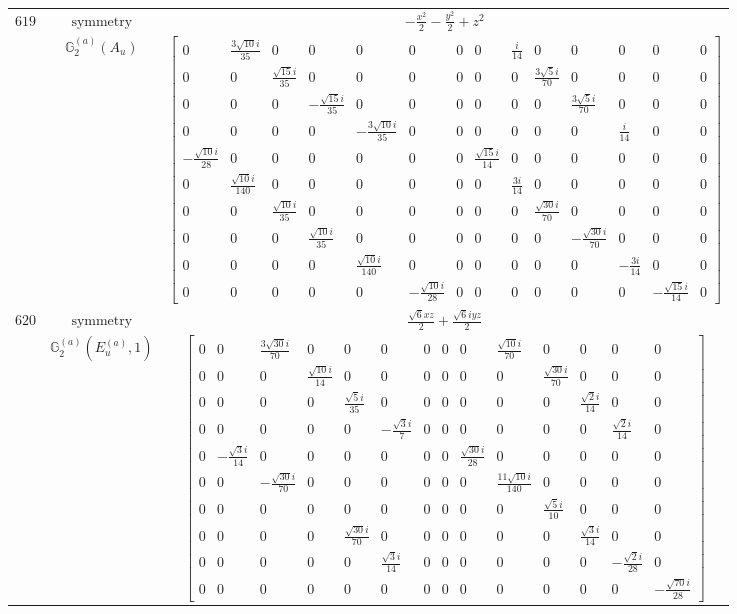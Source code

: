 \documentclass[fleqn,8pt,landscape]{jsarticle}
\begin{document}
\begin{longtable}{ccc}
$ 619 $ & $ \text{symmetry} $ & $ - \frac{x^{2}}{2} - \frac{y^{2}}{2} + z^{2} $ \\
$  $ & $ \mathbb{G}_{2}^{(a)}(A_{u}) $ & $ \begin{bmatrix} 0 & \frac{3 \sqrt{10} i}{35} & 0 & 0 & 0 & 0 & 0 & 0 & \frac{i}{14} & 0 & 0 & 0 & 0 & 0 \\ 0 & 0 & \frac{\sqrt{15} i}{35} & 0 & 0 & 0 & 0 & 0 & 0 & \frac{3 \sqrt{5} i}{70} & 0 & 0 & 0 & 0 \\ 0 & 0 & 0 & - \frac{\sqrt{15} i}{35} & 0 & 0 & 0 & 0 & 0 & 0 & \frac{3 \sqrt{5} i}{70} & 0 & 0 & 0 \\ 0 & 0 & 0 & 0 & - \frac{3 \sqrt{10} i}{35} & 0 & 0 & 0 & 0 & 0 & 0 & \frac{i}{14} & 0 & 0 \\ - \frac{\sqrt{10} i}{28} & 0 & 0 & 0 & 0 & 0 & 0 & \frac{\sqrt{15} i}{14} & 0 & 0 & 0 & 0 & 0 & 0 \\ 0 & \frac{\sqrt{10} i}{140} & 0 & 0 & 0 & 0 & 0 & 0 & \frac{3 i}{14} & 0 & 0 & 0 & 0 & 0 \\ 0 & 0 & \frac{\sqrt{10} i}{35} & 0 & 0 & 0 & 0 & 0 & 0 & \frac{\sqrt{30} i}{70} & 0 & 0 & 0 & 0 \\ 0 & 0 & 0 & \frac{\sqrt{10} i}{35} & 0 & 0 & 0 & 0 & 0 & 0 & - \frac{\sqrt{30} i}{70} & 0 & 0 & 0 \\ 0 & 0 & 0 & 0 & \frac{\sqrt{10} i}{140} & 0 & 0 & 0 & 0 & 0 & 0 & - \frac{3 i}{14} & 0 & 0 \\ 0 & 0 & 0 & 0 & 0 & - \frac{\sqrt{10} i}{28} & 0 & 0 & 0 & 0 & 0 & 0 & - \frac{\sqrt{15} i}{14} & 0 \end{bmatrix} $ \\ \hline
$ 620 $ & $ \text{symmetry} $ & $ \frac{\sqrt{6} x z}{2} + \frac{\sqrt{6} i y z}{2} $ \\
$  $ & $ \mathbb{G}_{2}^{(a)}(E_{u}^{(a)},1) $ & $ \begin{bmatrix} 0 & 0 & \frac{3 \sqrt{30} i}{70} & 0 & 0 & 0 & 0 & 0 & 0 & \frac{\sqrt{10} i}{70} & 0 & 0 & 0 & 0 \\ 0 & 0 & 0 & \frac{\sqrt{10} i}{14} & 0 & 0 & 0 & 0 & 0 & 0 & \frac{\sqrt{30} i}{70} & 0 & 0 & 0 \\ 0 & 0 & 0 & 0 & \frac{\sqrt{5} i}{35} & 0 & 0 & 0 & 0 & 0 & 0 & \frac{\sqrt{2} i}{14} & 0 & 0 \\ 0 & 0 & 0 & 0 & 0 & - \frac{\sqrt{3} i}{7} & 0 & 0 & 0 & 0 & 0 & 0 & \frac{\sqrt{2} i}{14} & 0 \\ 0 & - \frac{\sqrt{3} i}{14} & 0 & 0 & 0 & 0 & 0 & 0 & \frac{\sqrt{30} i}{28} & 0 & 0 & 0 & 0 & 0 \\ 0 & 0 & - \frac{\sqrt{30} i}{70} & 0 & 0 & 0 & 0 & 0 & 0 & \frac{11 \sqrt{10} i}{140} & 0 & 0 & 0 & 0 \\ 0 & 0 & 0 & 0 & 0 & 0 & 0 & 0 & 0 & 0 & \frac{\sqrt{5} i}{10} & 0 & 0 & 0 \\ 0 & 0 & 0 & 0 & \frac{\sqrt{30} i}{70} & 0 & 0 & 0 & 0 & 0 & 0 & \frac{\sqrt{3} i}{14} & 0 & 0 \\ 0 & 0 & 0 & 0 & 0 & \frac{\sqrt{3} i}{14} & 0 & 0 & 0 & 0 & 0 & 0 & - \frac{\sqrt{2} i}{28} & 0 \\ 0 & 0 & 0 & 0 & 0 & 0 & 0 & 0 & 0 & 0 & 0 & 0 & 0 & - \frac{\sqrt{70} i}{28} \end{bmatrix} $ \\ \hline

\end{longtable}
\end{document}
